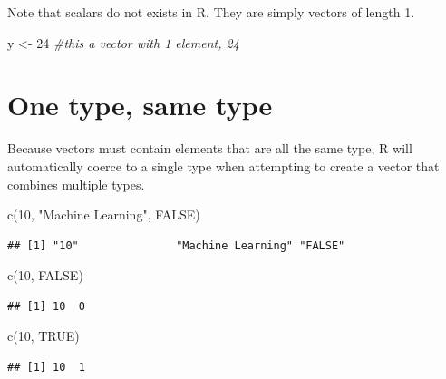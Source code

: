 \documentclass[
]{book}
\newenvironment{Shaded}{\begin{snugshade}}{\end{snugshade}}
\newcommand{\CommentTok}[1]{\textcolor[rgb]{0.56,0.35,0.01}{\textit{#1}}}
\newcommand{\ConstantTok}[1]{\textcolor[rgb]{0.00,0.00,0.00}{#1}}
\newcommand{\DecValTok}[1]{\textcolor[rgb]{0.00,0.00,0.81}{#1}}
\newcommand{\FunctionTok}[1]{\textcolor[rgb]{0.00,0.00,0.00}{#1}}
\newcommand{\NormalTok}[1]{#1}
\newcommand{\OtherTok}[1]{\textcolor[rgb]{0.56,0.35,0.01}{#1}}
\newcommand{\StringTok}[1]{\textcolor[rgb]{0.31,0.60,0.02}{#1}}
\begin{document}
Note that scalars do not exists in R. They are simply vectors of length 1.

\begin{Shaded}
\begin{Highlighting}[]
\NormalTok{y }\OtherTok{\textless{}{-}} \DecValTok{24}  \CommentTok{\#this a vector with 1 element, 24}
\end{Highlighting}
\end{Shaded}

\hypertarget{one-type-same-type}{%
\section{One type, same type}\label{one-type-same-type}}

Because vectors must contain elements that are all the same type, R will automatically coerce to a single type when attempting to create a vector that combines multiple types.

\begin{Shaded}
\begin{Highlighting}[]
\FunctionTok{c}\NormalTok{(}\DecValTok{10}\NormalTok{, }\StringTok{"Machine Learning"}\NormalTok{, }\ConstantTok{FALSE}\NormalTok{)}
\end{Highlighting}
\end{Shaded}

\begin{verbatim}
## [1] "10"               "Machine Learning" "FALSE"
\end{verbatim}

\begin{Shaded}
\begin{Highlighting}[]
\FunctionTok{c}\NormalTok{(}\DecValTok{10}\NormalTok{, }\ConstantTok{FALSE}\NormalTok{)}
\end{Highlighting}
\end{Shaded}

\begin{verbatim}
## [1] 10  0
\end{verbatim}

\begin{Shaded}
\begin{Highlighting}[]
\FunctionTok{c}\NormalTok{(}\DecValTok{10}\NormalTok{, }\ConstantTok{TRUE}\NormalTok{)}
\end{Highlighting}
\end{Shaded}

\begin{verbatim}
## [1] 10  1
\end{verbatim}
\end{document}
